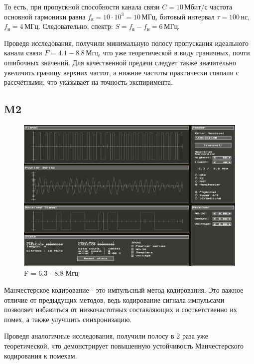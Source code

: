 То есть, при пропускной способности канала связи $C = 10 \, \text{Мбит/с}$ частота основной гармоники равна $f_{\text{в}} = 10 \cdot 10^3 = 10 \, \text{МГц}$, битовый интервал $\tau = 100 \, \text{нс}$, $f_{\text{н}} = 4 \, \text{МГц}$. Следовательно, спектр: $S = f_{\text{в}} - f_{\text{н}} = 6 \, \text{МГц}$.

Проведя исследования, получили минимальную полосу пропускания идеального канала связи $F = 4.1 - 8.8 \, \text{Мгц}$, что уже теоретической в виду граничных, почти ошибочных значений. Для качественной предачи следует также значительно увеличить границу верхних частот, а нижние частоты практически совпали с рассчётными, что указывает на точность экспиримента.

\subsection{M2}

\begin{figure}
	\centering
	\includegraphics[width=0.95\linewidth]{./data/ideal_m2_min_f.png}
	\caption{F = 6.3 - 8.8 Мгц}
\end{figure}

\vspace{-0mm}
Манчестерское кодирование - это импульсный метод кодирования. Это важное отличие от предыдущих методов, ведь кодирование сигнала импульсами позволяет избавиться от низкочастотных составляющих и соответственно их помех, а также улучшить синхронизацию.

Проведя аналогичные исследования, получили полосу в 2 раза уже теоретической, что демонстрирует повышенную устойчивость Манчестерского кодирования к помехам.

